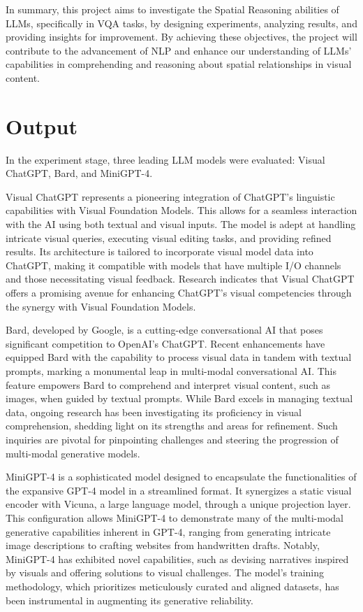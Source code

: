 \documentclass[journal,10pt]{IEEEtran}
\begin{document}
In summary, this project aims to investigate the Spatial Reasoning abilities of LLMs, specifically in VQA tasks, by designing experiments, analyzing results, and providing insights for improvement. By achieving these objectives, the project will contribute to the advancement of NLP and enhance our understanding of LLMs' capabilities in comprehending and reasoning about spatial relationships in visual content.

\section{Output}
In the experiment stage, three leading LLM models were evaluated: Visual ChatGPT\cite{wu2023visual}, Bard, and MiniGPT-4\cite{zhu2023minigpt4}.

Visual ChatGPT represents a pioneering integration of ChatGPT's linguistic capabilities with Visual Foundation Models. This allows for a seamless interaction with the AI using both textual and visual inputs. The model is adept at handling intricate visual queries, executing visual editing tasks, and providing refined results. Its architecture is tailored to incorporate visual model data into ChatGPT, making it compatible with models that have multiple I/O channels and those necessitating visual feedback. Research indicates that Visual ChatGPT offers a promising avenue for enhancing ChatGPT's visual competencies through the synergy with Visual Foundation Models\cite{wu2023visual}.

Bard, developed by Google, is a cutting-edge conversational AI that poses significant competition to OpenAI's ChatGPT. Recent enhancements have equipped Bard with the capability to process visual data in tandem with textual prompts, marking a monumental leap in multi-modal conversational AI. This feature empowers Bard to comprehend and interpret visual content, such as images, when guided by textual prompts. While Bard excels in managing textual data, ongoing research has been investigating its proficiency in visual comprehension, shedding light on its strengths and areas for refinement. Such inquiries are pivotal for pinpointing challenges and steering the progression of multi-modal generative models\cite{qin2023good}.

MiniGPT-4 is a sophisticated model designed to encapsulate the functionalities of the expansive GPT-4 model in a streamlined format. It synergizes a static visual encoder with Vicuna, a large language model, through a unique projection layer. This configuration allows MiniGPT-4 to demonstrate many of the multi-modal generative capabilities inherent in GPT-4, ranging from generating intricate image descriptions to crafting websites from handwritten drafts. Notably, MiniGPT-4 has exhibited novel capabilities, such as devising narratives inspired by visuals and offering solutions to visual challenges. The model's training methodology, which prioritizes meticulously curated and aligned datasets, has been instrumental in augmenting its generative reliability\cite{zhu2023minigpt4}.
\end{document}
